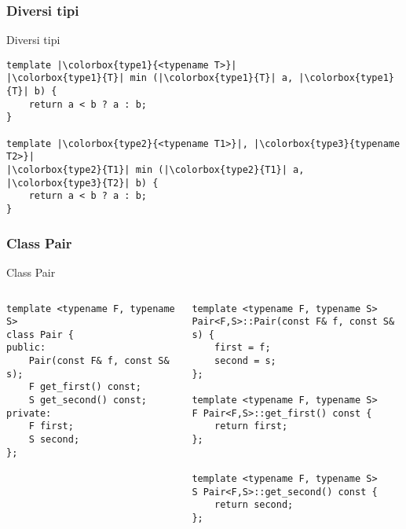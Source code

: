 \documentclass[xcolor={dvipsnames, svgnames, x11names, table}, 10pt]{beamer}
\begin{document}
\subsubsection*{Diversi tipi}

\setlength{\fboxsep}{2pt}

\begin{frame}[c, fragile]{Diversi tipi}
\begin{verbatim}
template |\colorbox{type1}{<typename T>}|
|\colorbox{type1}{T}| min (|\colorbox{type1}{T}| a, |\colorbox{type1}{T}| b) {
    return a < b ? a : b;
}

template |\colorbox{type2}{<typename T1>}|, |\colorbox{type3}{typename T2>}|
|\colorbox{type2}{T1}| min (|\colorbox{type2}{T1}| a, |\colorbox{type3}{T2}| b) {
    return a < b ? a : b;
}

\end{verbatim}

\end{frame}

\subsubsection*{Class Pair}

\begin{frame}[t, fragile]{Class Pair}

\begin{columns}[t]

\begin{verbatim}
template <typename F, typename S>
class Pair {
public:
    Pair(const F& f, const S& s);
    F get_first() const;
    S get_second() const;
private:
    F first;
    S second;
};
\end{verbatim}

\begin{verbatim}
template <typename F, typename S>
Pair<F,S>::Pair(const F& f, const S& s) {
    first = f;
    second = s;
};

template <typename F, typename S>
F Pair<F,S>::get_first() const {
    return first;
};


template <typename F, typename S>
S Pair<F,S>::get_second() const {
    return second;
};
\end{verbatim}

\end{columns}
\end{frame}
\end{document}

